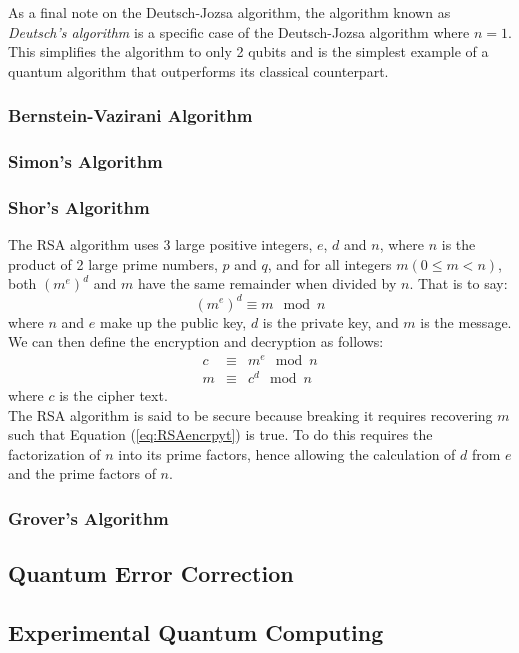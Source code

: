 \documentclass[reqno]{amsart}
\numberwithin{equation}{section}
\numberwithin{figure}{section}
\begin{document}
\begin{justify}
As a final note on the Deutsch-Jozsa algorithm, the algorithm known as \textit{Deutsch's algorithm} is a specific case of the Deutsch-Jozsa algorithm where $n = 1$. This simplifies the algorithm to only 2 qubits and is the simplest example of a quantum algorithm that outperforms its classical counterpart.
\end{justify}
\subsubsection{Bernstein-Vazirani Algorithm}
\subsubsection{Simon's Algorithm}
\subsubsection{Shor's Algorithm} \label{sec:ShorsAlgorithm}
\begin{justify}
The RSA algorithm uses 3 large positive integers, $e$, $d$ and $n$, where $n$ is the product of 2 large prime numbers, $p$ and $q$, and for all integers $m(0 \leq m < n)$, both $(m^{e})^{d}$ and $m$ have the same remainder when divided by $n$. That is to say:
    \begin{equation}
        (m^{e})^{d} \equiv m \mod n
    \end{equation}
where $n$ and $e$ make up the public key, $d$ is the private key, and $m$ is the message. We can then define the encryption and decryption as follows: 
    \begin{eqnarray}
        c &\equiv& m^{e} \mod n \label{eq:RSAencrpyt} \\
        m &\equiv& c^{d} \mod n
    \end{eqnarray}
where $c$ is the cipher text. \\

The RSA algorithm is said to be secure because breaking it requires recovering $m$ such that Equation (\ref{eq:RSAencrpyt}) is true. To do this requires the factorization of $n$ into its prime factors, hence allowing the calculation of $d$ from $e$ and the prime factors of $n$.
\end{justify}
\subsubsection{Grover's Algorithm} \label{sec:GroversAlgorithm}
\subsection{Quantum Error Correction}
\subsection{Experimental Quantum Computing}



\end{document}
